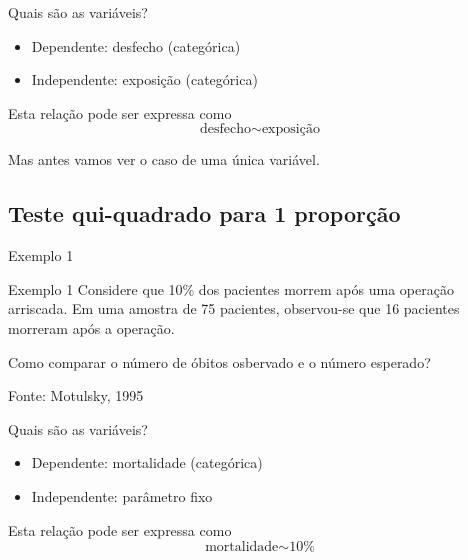 \documentclass{beamer}
\begin{document}
\begin{frame}{Quais são as variáveis?}
  \begin{itemize}
    \small
  \item Dependente: desfecho (categórica)
  \item Independente: exposição (categórica)
  \end{itemize}
  \vfill
  \begin{block}{Esta relação pode ser expressa como}
    \begin{displaymath}
      \text{desfecho} \sim \text{exposição}
    \end{displaymath}
  \end{block}
\end{frame}

\begin{frame}{}
  \begin{center}
    Mas antes vamos ver o caso de uma única variável.
  \end{center}
\end{frame}

\subsection{Teste qui-quadrado para 1 proporção}

\begin{frame}{Exemplo 1}
  \begin{exampleblock}{Exemplo 1}
    \small
    Considere que 10\% dos pacientes morrem após uma operação
    arriscada. Em uma amostra de 75 pacientes, observou-se que 16
    pacientes morreram após a operação.

    \bigskip
    Como comparar o número de óbitos osbervado e o número esperado?

    \bigskip
    {\hfill \scriptsize Fonte: Motulsky, 1995}
  \end{exampleblock}
\end{frame}

\begin{frame}{Quais são as variáveis?}
  \begin{itemize}
    \small
  \item Dependente: mortalidade (categórica)
  \item Independente: parâmetro fixo
  \end{itemize}
  \vfill
  \begin{block}{Esta relação pode ser expressa como}
    \begin{displaymath}
      \text{mortalidade} \sim \text{10\%}
    \end{displaymath}
  \end{block}
\end{frame}
\end{document}
